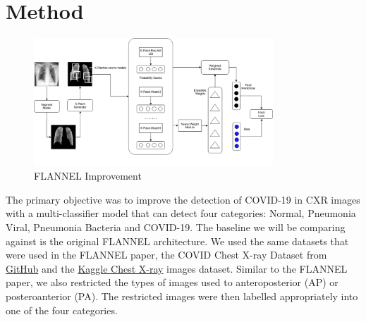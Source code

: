 \documentclass{sigkddExp}
\begin{document}
\section{Method}

\begin{figure}[h]
    \centering
    \includegraphics[width=0.8\textwidth]{../doc/images/Flannel_Improved_Latest.png}
    \caption{FLANNEL Improvement}
    \label{fig:improve}
\end{figure}

The primary objective was to improve the detection of COVID-19 in CXR images
with a multi-classifier model that can detect four categories: Normal, Pneumonia
Viral, Pneumonia Bacteria and COVID-19. The baseline we will be comparing
against is the original FLANNEL architecture. We used the same datasets that
were used in the FLANNEL paper, the COVID Chest X-ray Dataset
\cite{cohen2020covidProspective} from
\href{https://github.com/ieee8023/covid-chestxray-dataset/tree/78543292f8b01d5e0ed1d0e15dce71949f0657bb}{GitHub} and the
\href{https://www.kaggle.com/paultimothymooney/chest-xray-pneumonia}{Kaggle
    Chest X-ray} images dataset. Similar to the FLANNEL paper, we also restricted
the types of images used to anteroposterior (AP) or posteroanterior (PA). The
restricted images were then labelled appropriately into one of the four
categories.
\end{document}
